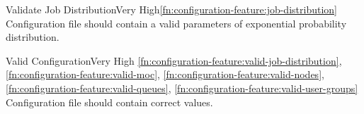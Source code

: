 	\begin{functional}{Validate Job Distribution}{Very High}{\ref{fn:configuration-feature:job-distribution}}
		\label{fn:configuration-feature:valid-job-distribution}
		{
			Configuration file should contain a valid parameters of exponential probability distribution.	
		}
	\end{functional}

	\begin{functional}{Valid Configuration}{Very High}
		{
			\ref{fn:configuration-feature:valid-job-distribution},
			\ref{fn:configuration-feature:valid-moc},
			\ref{fn:configuration-feature:valid-nodes},
			\ref{fn:configuration-feature:valid-queues},
			\ref{fn:configuration-feature:valid-user-groups}
		}
		\label{fn:configuration-feature:valid-configuration}
		{
			Configuration file should contain correct values.
		}
	\end{functional}
	